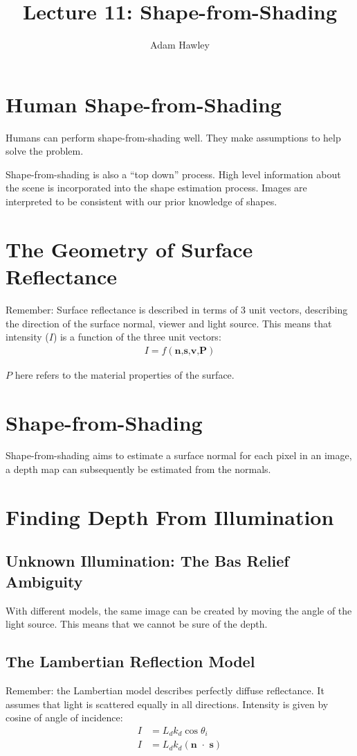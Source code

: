 \documentclass{article}
\author{Adam Hawley}
\title{Lecture 11: Shape-from-Shading}
\begin{document}
\maketitle

\section{Human Shape-from-Shading}
Humans can perform shape-from-shading well.
They make assumptions to help solve the problem.

Shape-from-shading is also a ``top down'' process.
High level information about the scene is incorporated into the shape estimation process.
Images are interpreted to be consistent with our prior knowledge of shapes.

\section{The Geometry of Surface Reflectance}
Remember: Surface reflectance is described in terms of 3 unit vectors, describing the direction of the surface normal, viewer and light source.
This means that intensity ($I$) is a function of the three unit vectors:
\begin{align*}
	I = f(\textbf{n,s,v,P})
\end{align*}

$P$ here refers to the material properties of the surface.

\section{Shape-from-Shading}
Shape-from-shading aims to estimate a surface normal for each pixel in an image, a depth map can subsequently be estimated from the normals.

\section{Finding Depth From Illumination}

\subsection{Unknown Illumination: The Bas Relief Ambiguity}
With different models, the same image can be created by moving the angle of the light source.
This means that we cannot be sure of the depth.

\subsection{The Lambertian Reflection Model  }
Remember: the Lambertian model describes perfectly diffuse reflectance.
It assumes that light is scattered equally in all directions.
Intensity is given by cosine of angle of incidence:
\begin{align*}
	I &= L_dk_d\cos\theta_i \\
	I &= L_dk_d(\textbf{n $\cdot$ s})
\end{align*}
\end{document}
